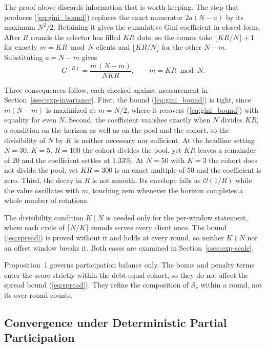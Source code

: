 \documentclass[journal]{IEEEtran}
\newcommand{\rev}[1]{#1}
\begin{document}
\rev{The proof above discards information that is worth keeping. The step that produces (\ref{eq:gini_bound}) replaces the exact numerator $2a(N-a)$ by its maximum $N^2/2$. Retaining it gives the cumulative Gini coefficient in closed form. After $R$ rounds the selector has filled $KR$ slots, so the counts take $\lfloor KR/N \rfloor + 1$ for exactly $m = KR \bmod N$ clients and $\lfloor KR/N \rfloor$ for the other $N-m$. Substituting $a = N-m$ gives}
\begin{equation}
\rev{G^{(R)} = \frac{m\,(N-m)}{N K R}, \qquad m = KR \bmod N .}
\label{eq:gini_exact}
\end{equation}

\rev{Three consequences follow, each checked against measurement in Section~\ref{ssec:exp-invariance}. First, the bound (\ref{eq:gini_bound}) is tight, since $m(N-m)$ is maximized at $m = N/2$, where it recovers (\ref{eq:gini_bound}) with equality for even $N$. Second, the coefficient vanishes exactly when $N$ divides $KR$, a condition on the horizon as well as on the pool and the cohort, so the divisibility of $N$ by $K$ is neither necessary nor sufficient. At the headline setting $N=30$, $K=5$, $R=100$ the cohort divides the pool, yet $KR$ leaves a remainder of $20$ and the coefficient settles at $1.33\%$. At $N=50$ with $K=3$ the cohort does not divide the pool, yet $KR = 300$ is an exact multiple of $50$ and the coefficient is zero. Third, the decay in $R$ is not smooth. Its envelope falls as $\mathcal{O}(1/R)$ while the value oscillates with $m$, touching zero whenever the horizon completes a whole number of rotations.}

\rev{The divisibility condition $K \mid N$ is needed only for the per-window statement, where each cycle of $\lceil N/K \rceil$ rounds serves every client once. The bound (\ref{eq:spread}) is proved without it and holds at every round, so neither $K \nmid N$ nor an offset window breaks it. Both cases are examined in Section~\ref{ssec:exp-scale}.}

Proposition~1 governs participation balance only. The bonus and penalty terms enter the score strictly within the debt-equal cohort, so they do not affect the spread bound (\ref{eq:spread}). They refine the composition of $\mathcal{S}_r$ within a round, not its over-round counts. %

\subsection{\rev{Convergence under Deterministic Partial Participation}}
\label{ssec:convergence-compat}
\end{document}
